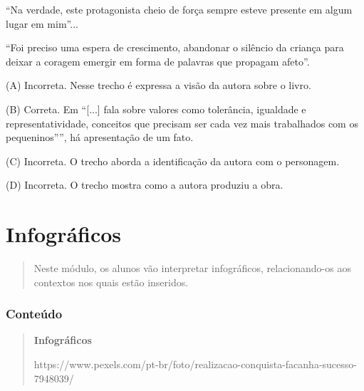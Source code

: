 \begin{escolha}
\begin{escolha}
{\begin{escolha}
\item ``Na verdade, este protagonista cheio de força sempre esteve
presente em algum lugar em mim''...

\item ``Foi preciso uma espera de crescimento, abandonar o silêncio da
criança para deixar a coragem emergir em forma de palavras que propagam
afeto''.
\end{escolha}


(A) Incorreta. Nesse trecho é expressa a visão da autora sobre o livro.

(B) Correta. Em ``{[}...{]} fala sobre valores como tolerância,
igualdade e representatividade, conceitos que precisam ser cada vez mais
trabalhados com os pequeninos'''', há apresentação de um fato.

(C) Incorreta. O trecho aborda a identificação da autora com o
personagem.

(D) Incorreta. O trecho mostra como a autora produziu a obra.

\chapter{Infográficos}

\begin{quote}
Neste módulo, os alunos vão interpretar infográficos, relacionando-os
aos contextos nos quais estão inseridos.
\end{quote}

\subsection{Conteúdo}\label{conteuxfado-8}

\begin{quote}
\textbf{Infográficos}

https://www.pexels.com/pt-br/foto/realizacao-conquista-facanha-sucesso-7948039/


\end{quote}}
\end{escolha}
\end{escolha}
